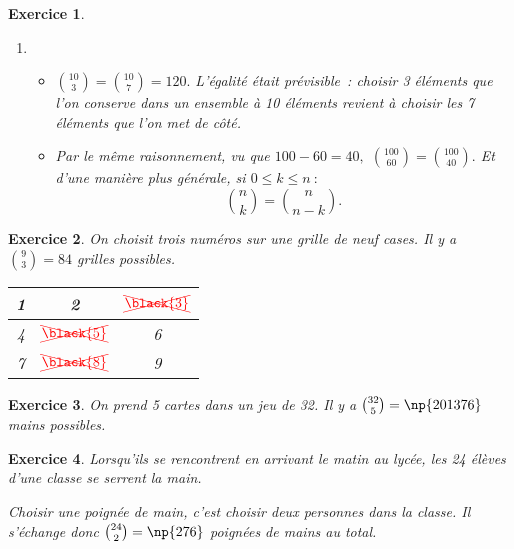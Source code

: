 \documentclass[10pt]{article}
\newtheorem{exo}{Exercice}
\begin{document}
\begin{exo}
\begin{enumerate}
\item \begin{itemize}
\item[\textbullet] $\binom{10}{3}=\binom{10}{7}=120.$ L'égalité était prévisible~: choisir 3 éléments que l'on conserve dans un ensemble à 10 éléments revient à choisir les 7 éléments que l'on met de côté.
\item[\textbullet] Par le même raisonnement, vu que $100-60=40,$ $\binom{100}{60}=\binom{100}{40}.$ Et d'une manière plus générale, si $0\leq k\leq n~:$
\[\binom{n}{k}=\binom{n}{n-k}.\]
\end{itemize}

\end{enumerate}

\end{exo}



\begin{exo}

On choisit trois numéros sur une grille de neuf cases. Il y a $\binom{9}{3}=84$ grilles possibles.

\medskip



\begin{center}
 \begin{tabular}{|c|c|c|}\hline
1& 2&$\textcolor{red}{\xcancel{\black{3}}}$ \\ \hline
4&$\textcolor{red}{\xcancel{\black{5}}}$&6\\ \hline
7&$\textcolor{red}{\xcancel{\black{8}}}$&9\\ \hline
\end{tabular}
\end{center}

\end{exo}



\begin{exo}

On prend 5 cartes dans un jeu de 32. Il y a $\binom{32}{5}=\np{201376}$ mains possibles.

\end{exo}

\begin{exo}

Lorsqu'ils se rencontrent en arrivant le matin au lycée, les 24 élèves d'une classe se serrent la main.

\medskip

Choisir une poignée de main, c'est choisir deux personnes dans la classe. Il s'échange donc  $\binom{24}{2}=\np{276}$ poignées de mains au total.

\end{exo}
\end{document}
